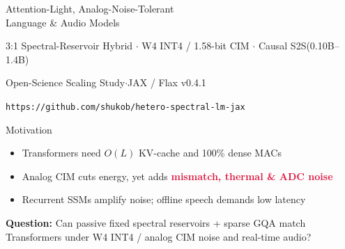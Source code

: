 \documentclass[aspectratio=169,10pt]{beamer}
\newcommand{\accentr}[1]{\textcolor{Crimson}{\textbf{#1}}}
\begin{document}
\begin{frame}[plain]
  \vspace*{1.20cm}
  \begin{center}
    {\fontsize{25}{32}\selectfont Attention-Light, Analog-Noise-Tolerant\\[0.12em]Language \& Audio Models\par}
    \vspace*{0.50cm}
    {\fontsize{12.2}{16}\selectfont\color{Muted} 3:1 Spectral-Reservoir Hybrid $\cdot$ W4 INT4 / 1.58-bit CIM $\cdot$ Causal S2S\quad (0.10B--1.4B)\par}
    \vspace*{1.35cm}
    {\fontsize{10.5}{14}\selectfont Open-Science Scaling Study\quad$\cdot$\quad JAX / Flax v0.4.1\par}
    \vspace*{0.16cm}
    {\fontsize{9.2}{12}\selectfont\color{Muted}\texttt{https://github.com/shukob/hetero-spectral-lm-jax}\par}
  \end{center}
\end{frame}

\begin{frame}{Motivation}
  \vspace*{0.40cm}
  \begin{itemize}\setlength{\itemsep}{0.95em}
    \item {\large Transformers need $O(L)$ KV-cache and 100\% dense MACs}
    \item {\large Analog CIM cuts energy, yet adds \accentr{mismatch, thermal \& ADC noise}}
    \item {\large Recurrent SSMs amplify noise; offline speech demands low latency}
  \end{itemize}
  \vspace*{0.90cm}
  \begin{center}
    {\fontsize{13.0}{19}\selectfont\color{Teal}\textbf{Question:} Can passive fixed spectral reservoirs + sparse GQA match Transformers under W4 INT4 / analog CIM noise and real-time audio?}
  \end{center}
\end{frame}
\end{document}
